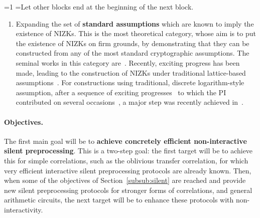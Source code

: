 \documentclass[oneside, a4paper, onecolumn, 11pt]{article}
\newcounter{alphasect}
\def\alphainsection{0}
\newenvironment{alphasection}{%
  \ifnum\alphainsection=1%
    \errhelp={Let other blocks end at the beginning of the next block.}
    \errmessage{Nested Alpha section not allowed}
  \fi%
  \setcounter{alphasect}{0}
  \def\alphainsection{1}
}{%
  \setcounter{alphasect}{0}
  \def\alphainsection{0}
}%
\begin{document}
\begin{alphasection}
\begin{enumerate}[wide, labelwidth=!, labelindent=0pt]
    \item Expanding the set of \textbf{standard assumptions} which are known to imply the existence of NIZKs. This is the most theoretical category, whose aim is to put the existence of NIZKs on firm grounds, by demonstrating that they can be constructed from any of the most standard cryptographic assumptions. The seminal works in this category are~\cite{STOC:BluFelMic88,FOCS:FeiLapSha90}. Recently, exciting progress has been made, leading to the construction of NIZKs under traditional lattice-based assumptions~\cite{STOC:CCHLRRW19,C:PeiShi19}. For constructions using traditional, discrete logarithm-style assumption, after a sequence of exciting progresses~\cite{EC:CCRR18,STOC:CCHLRRW19,EC:CouKatUrs20,C:BraKopMou20} to which the PI contributed on several occasions~\cite{EC:CouHof19,EC:CouKatUrs20,TCC:CKSU21}, a major step was recently achieved in~\cite{EC:JaiJin21}.
\end{enumerate}

\paragraph{Objectives.} The first main goal will be to \textbf{achieve concretely efficient non-interactive silent preprocessing}. This is a two-step goal: the first target will be to achieve this for simple correlations, such as the oblivious transfer correlation, for which very efficient interactive silent preprocessing protocols are already known. Then, when some of the objectives of Section~\ref{subsub:silent} are reached and provide new silent preprocessing protocols for stronger forms of correlations, and general arithmetic circuits, the next target will be to enhance these protocols with non-interactivity.


\end{alphasection}
\end{document}

